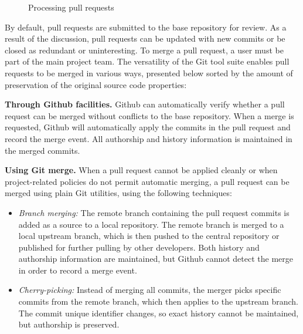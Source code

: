 \documentclass{sig-alternate}
\begin{document}
\begin{figure}[t]
  \centering
{}
\caption{Processing pull requests}
\end{figure}

By default, pull requests are submitted to the base repository for review.
As a result of the discussion, pull requests can be updated with new commits or
be closed as redundant or uninteresting. To merge a pull request, a user must
be part of the main project team. The versatility of the Git tool suite enables
pull requests to be merged in various ways, presented below sorted by
the amount of preservation of the original source code properties:

\textbf{Through Github facilities.}
    Github can automatically verify whether a
    pull request can be merged without conflicts to the base repository. When a
    merge is requested, Github will automatically apply the commits in the pull
    request and record the merge event. All authorship and history information
    is maintained in the merged commits.

    \textbf{Using Git merge.} When a pull request cannot be applied cleanly or when
    project-related policies do not permit automatic merging, a pull request
    can be merged using plain Git utilities, using the following
    techniques: 

    \begin{itemize}

      \item \emph{Branch merging:} The remote branch containing the pull
        request commits is added as a source to a local repository. The remote 
        branch is merged to a local upstream branch, which is then pushed to
        the central repository or published for further pulling by other
        developers. Both history and authorship information are maintained,
        but Github cannot detect the merge in order to record a merge event. 

      \item \emph{Cherry-picking:} Instead of merging all commits, the merger
        picks specific commits from the remote branch, which then applies to the
        upstream branch. The commit unique identifier changes, so exact history
        cannot be maintained, but authorship is preserved.
    
    \end{itemize}
\end{document}
